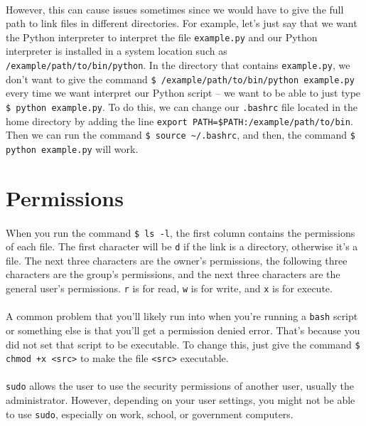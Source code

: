 \documentclass{article}
\begin{document}
\paragraph{} However, this can cause issues sometimes since we would have to give the full path to link files in different directories. For example, let's just say that we want the Python interpreter to interpret the file \texttt{example.py} and our Python interpreter is installed in a system location such as \texttt{/example/path/to/bin/python}. In the directory that contains \texttt{example.py}, we don't want to give the command \texttt{\$ /example/path/to/bin/python example.py} every time we want interpret our Python script -- we want to be able to just type \texttt{\$ python example.py}. To do this, we can change our \texttt{.bashrc} file located in the home directory by adding the line \texttt{export PATH=\$PATH:/example/path/to/bin}. Then we can run the command \texttt{\$ source \~\//.bashrc}, and then, the command \texttt{\$ python example.py} will work.

\section{Permissions}

\paragraph{} When you run the command \texttt{\$ ls -l}, the first column contains the permissions of each file. The first character will be \texttt{d} if the link is a directory, otherwise it's a file. The next three characters are the owner's permissions, the following three characters are the group's permissions, and the next three characters are the general user's permissions. \texttt{r} is for read, \texttt{w} is for write, and \texttt{x} is for execute.

\paragraph{} A common problem that you'll likely run into when you're running a \texttt{bash} script or something else is that you'll get a permission denied error. That's because you did not set that script to be executable. To change this, just give the command \texttt{\$ chmod +x <src>} to make the file \texttt{<src>} executable.

\paragraph{} \texttt{sudo} allows the user to use the security permissions of another user, usually the administrator. However, depending on your user settings, you might not be able to use \texttt{sudo}, especially on work, school, or government computers.
\end{document}
